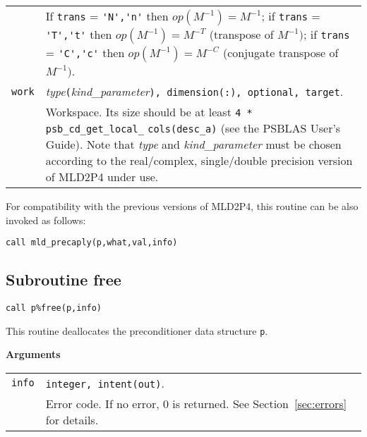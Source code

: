 \begin{tabular}{p{1.2cm}p{12cm}}
              & If \verb|trans| = \verb|'N','n'| then $op(M^{-1}) = M^{-1}$;
                if \verb|trans| = \verb|'T','t'| then $op(M^{-1}) = M^{-T}$
                (transpose of $M^{-1})$;  if \verb|trans| = \verb|'C','c'| then $op(M^{-1}) = M^{-C}$
                (conjugate transpose of $M^{-1})$.\\
\verb|work|  & \emph{type}\verb|(|\emph{kind\_parameter}\verb|), dimension(:), optional, target|.\\
             & Workspace. Its size should be at
               least \verb|4 * psb_cd_get_local_| \verb|cols(desc_a)| (see the PSBLAS User's Guide).
               Note that \emph{type} and \emph{kind\_parameter} must be chosen according
               to the real/complex, single/double precision version of MLD2P4 under use.\\
\end{tabular}

\baselineskip
For compatibility with the previous versions of MLD2P4, this routine can be also invoked
as follows:

\begin{center}
\verb|call mld_precaply(p,what,val,info)|
\end{center}

\clearpage

\subsection{Subroutine free\label{sec:precfree}}

\begin{center}
\verb|call p%free(p,info)|\\
\end{center}

\noindent
This routine deallocates the preconditioner data structure \verb|p|.

{\baselineskip\noindent\large\bfseries Arguments} \smallskip

\begin{tabular}{p{1.2cm}p{10.5cm}}
\verb|info|   & \verb|integer, intent(out)|.\\
              & Error code. If no error, 0 is returned. See Section~\ref{sec:errors} for details.\\
\end{tabular}

